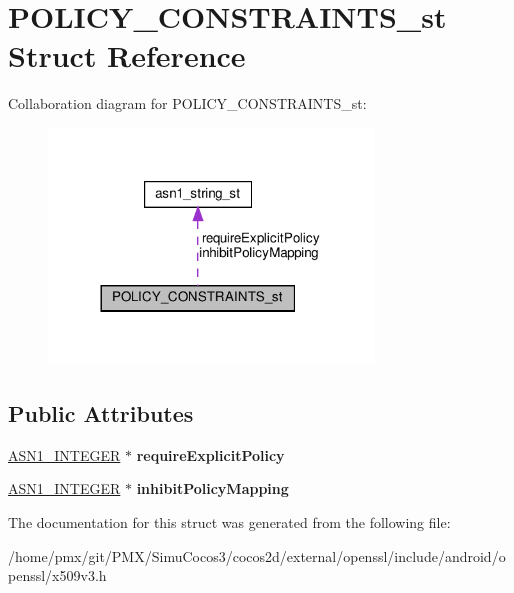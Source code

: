 \hypertarget{structPOLICY__CONSTRAINTS__st}{}\section{P\+O\+L\+I\+C\+Y\+\_\+\+C\+O\+N\+S\+T\+R\+A\+I\+N\+T\+S\+\_\+st Struct Reference}
\label{structPOLICY__CONSTRAINTS__st}


Collaboration diagram for P\+O\+L\+I\+C\+Y\+\_\+\+C\+O\+N\+S\+T\+R\+A\+I\+N\+T\+S\+\_\+st\+:
\nopagebreak
\begin{figure}[H]
\begin{center}
\leavevmode
\includegraphics[width=245pt]{structPOLICY__CONSTRAINTS__st__coll__graph}
\end{center}
\end{figure}
\subsection*{Public Attributes}
\begin{DoxyCompactItemize}
\item 
\mbox{\label{structPOLICY__CONSTRAINTS__st_abb1ed5718a79d75f224cf85569f9ba0a}} 
\hyperlink{structasn1__string__st}{A\+S\+N1\+\_\+\+I\+N\+T\+E\+G\+ER} $\ast$ {\bfseries require\+Explicit\+Policy}
\item 
\mbox{\label{structPOLICY__CONSTRAINTS__st_a30814a0af0daafed07467eb63de4ad0b}} 
\hyperlink{structasn1__string__st}{A\+S\+N1\+\_\+\+I\+N\+T\+E\+G\+ER} $\ast$ {\bfseries inhibit\+Policy\+Mapping}
\end{DoxyCompactItemize}


The documentation for this struct was generated from the following file\+:\begin{DoxyCompactItemize}
\item 
/home/pmx/git/\+P\+M\+X/\+Simu\+Cocos3/cocos2d/external/openssl/include/android/openssl/x509v3.\+h\end{DoxyCompactItemize}
